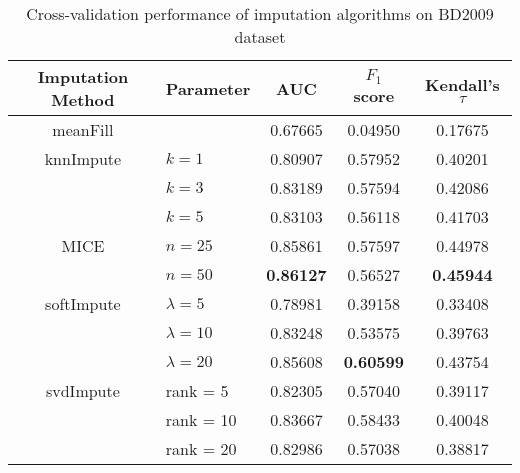\begin{table}[htbp]
\centering
\begin{tabular}{cl||ccc}
\toprule
Imputation Method & Parameter & AUC & $F_1$ score & Kendall's $\tau$ \\
\midrule 
meanFill & &   0.67665 &  0.04950 &  0.17675 \\
\midrule
knnImpute & $k = 1$ &  0.80907 &  0.57952 &  0.40201 \\
  & $k = 3$  &  0.83189 &  0.57594 &  0.42086 \\
  & $k = 5$ &  0.83103 &  0.56118 &  0.41703 \\
\midrule
MICE & $n = 25$  &  0.85861 &  0.57597 &  0.44978 \\
     & $n = 50$  &  {\bf 0.86127} &  0.56527 &  {\bf 0.45944} \\
\midrule
softImpute & $\lambda=5$ &  0.78981 &  0.39158 &  0.33408 \\
& $\lambda=10$ &  0.83248 &  0.53575 &  0.39763 \\
& $\lambda=20$ &  0.85608 &  {\bf 0.60599} &  0.43754 \\
             
\midrule
svdImpute & rank = 5  &  0.82305 &  0.57040 &  0.39117 \\
& rank = 10  &  0.83667 &  0.58433 &  0.40048 \\
& rank = 20  &  0.82986 &  0.57038 &  0.38817 \\
\bottomrule[1.25pt]
\end{tabular}
\begin{center}
\caption{Cross-validation performance of imputation algorithms on BD2009 dataset} \label{tab:imputation}
\end{center}
\end{table}

